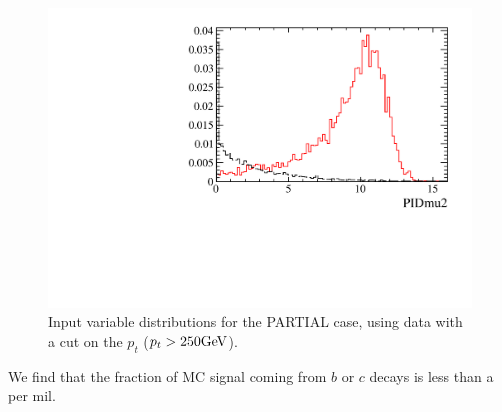 \begin{figure} [htb!]
\begin{center}
\includegraphics[scale=0.20]{figs/PIDmu2PARTIALptcut.pdf}
\caption{Input variable distributions for the PARTIAL case, using \Kspipi data with a cut on the $p_t$ ($p_t > 250 \rm GeV$).
\label{fig:MVAhistos_PARTIAL2pipi2}}
\end{center}
\end{figure}



We find that the fraction of MC signal \KS coming from $b$ or $c$ decays
is less than a per mil.
